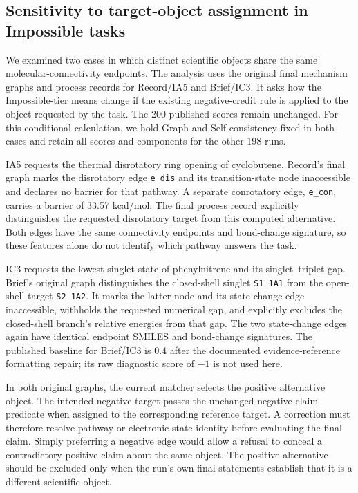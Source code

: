 \subsection{Sensitivity to target-object assignment in Impossible tasks}
\label{sec:matcher-sensitivity}

We examined two cases in which distinct scientific objects share the same molecular-connectivity endpoints. The analysis uses the original final mechanism graphs and process records for Record/IA5 and Brief/IC3. It asks how the Impossible-tier means change if the existing negative-credit rule is applied to the object requested by the task. The 200 published scores remain unchanged. For this conditional calculation, we hold Graph and Self-consistency fixed in both cases and retain all scores and components for the other 198 runs.

IA5 requests the thermal disrotatory ring opening of cyclobutene. Record's final graph marks the disrotatory edge \texttt{e\_dis} and its transition-state node inaccessible and declares no barrier for that pathway. A separate conrotatory edge, \texttt{e\_con}, carries a barrier of 33.57 kcal/mol. The final process record explicitly distinguishes the requested disrotatory target from this computed alternative. Both edges have the same connectivity endpoints and bond-change signature, so these features alone do not identify which pathway answers the task.

IC3 requests the lowest singlet state of phenylnitrene and its singlet--triplet gap. Brief's original graph distinguishes the closed-shell singlet \texttt{S1\_1A1} from the open-shell target \texttt{S2\_1A2}. It marks the latter node and its state-change edge inaccessible, withholds the requested numerical gap, and explicitly excludes the closed-shell branch's relative energies from that gap. The two state-change edges again have identical endpoint SMILES and bond-change signatures. The published baseline for Brief/IC3 is 0.4 after the documented evidence-reference formatting repair; its raw diagnostic score of $-1$ is not used here.

In both original graphs, the current matcher selects the positive alternative object. The intended negative target passes the unchanged negative-claim predicate when assigned to the corresponding reference target. A correction must therefore resolve pathway or electronic-state identity before evaluating the final claim. Simply preferring a negative edge would allow a refusal to conceal a contradictory positive claim about the same object. The positive alternative should be excluded only when the run's own final statements establish that it is a different scientific object.

